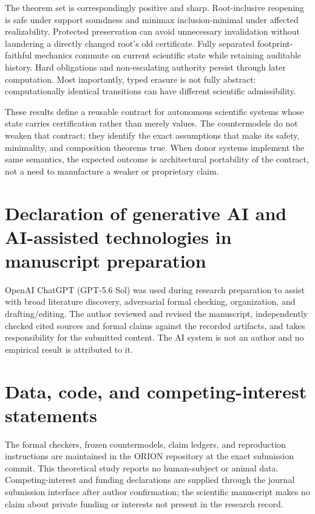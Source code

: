 \documentclass[11pt]{article}
\begin{document}
The theorem set is correspondingly positive and sharp. Root-inclusive reopening is safe under support soundness and minimax inclusion-minimal under affected realizability. Protected preservation can avoid unnecessary invalidation without laundering a directly changed root's old certificate. Fully separated footprint-faithful mechanics commute on current scientific state while retaining auditable history. Hard obligations and non-escalating authority persist through later computation. Most importantly, typed erasure is not fully abstract: computationally identical transitions can have different scientific admissibility.

These results define a reusable contract for autonomous scientific systems whose state carries certification rather than merely values. The countermodels do not weaken that contract; they identify the exact assumptions that make its safety, minimality, and composition theorems true. When donor systems implement the same semantics, the expected outcome is architectural portability of the contract, not a need to manufacture a weaker or proprietary claim.

\section*{Declaration of generative AI and AI-assisted technologies in manuscript preparation}
OpenAI ChatGPT (GPT-5.6 Sol) was used during research preparation to assist with broad literature discovery, adversarial formal checking, organization, and drafting/editing. The author reviewed and revised the manuscript, independently checked cited sources and formal claims against the recorded artifacts, and takes responsibility for the submitted content. The AI system is not an author and no empirical result is attributed to it.

\section*{Data, code, and competing-interest statements}
The formal checkers, frozen countermodels, claim ledgers, and reproduction instructions are maintained in the ORION repository at the exact submission commit. This theoretical study reports no human-subject or animal data. Competing-interest and funding declarations are supplied through the journal submission interface after author confirmation; the scientific manuscript makes no claim about private funding or interests not present in the research record.
\end{document}
